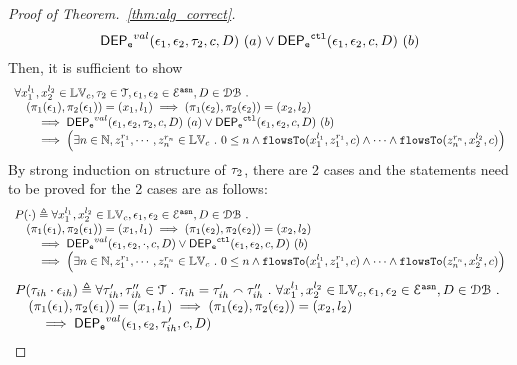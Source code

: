 \begin{proof}[Proof of Theorem.~\ref{thm:alg_correct}]
\[\mathsf{DEP_{\mathtt{e}}}^{val}(\mathtt{\epsilon}_1, \mathtt{\epsilon}_2, \mathtt{\tau}_2, c, D) ~ (a) 
\lor
\mathsf{DEP_{\mathtt{e}}}^{\mathtt{{ctl}}}(\mathtt{\epsilon}_1, \mathtt{\epsilon}_2, c, D) ~ (b)
\]
%
Then, it is sufficient to show
%
\[
\begin{array}{l}
\forall {x}_1^{l_1}, {x}_2^{l_2} \in \mathbb{LV}_{{c}}, \mathtt{\tau}_2 \in \mathcal{T}, 
\mathtt{\epsilon}_1, \mathtt{\epsilon}_2 \in \mathcal{E}^{\mathtt{{asn}}}, D \in \mathcal{DB} ~.~
\\ \quad
(\pi_{1}{(\mathtt{\epsilon}_1)}, \pi_{2}{(\mathtt{\epsilon}_1)}) = ({x}_1, l_1)
\implies
(\pi_{1}{(\mathtt{\epsilon}_2)}, \pi_{2}{(\mathtt{\epsilon}_2)}) = ({x}_2, l_2)
 \\ \qquad \implies 
\mathsf{DEP_{\mathtt{e}}}^{val}(\mathtt{\epsilon}_1, \mathtt{\epsilon}_2, \mathtt{\tau}_2, c, D) ~ (a)
\lor
\mathsf{DEP_{\mathtt{e}}}^{\mathtt{{ctl}}}(\mathtt{\epsilon}_1, \mathtt{\epsilon}_2, c, D)  ~ (b)
 \\ \qquad \implies
   \Big(\exists  n \in \mathbb{N}, z_1^{r_1}, \cdots, z_n^{r_n} \in \mathbb{LV}_{{c}} ~.~ 0 \leq n
 \land \mathtt{flowsTo}(x_1^{l_1}, z_1^{r_1}, c) \land \cdots \land \mathtt{flowsTo}(z_n^{r_n}, {x}_2^{l_2}, c) \Big)
\end{array}
\]
%
%
By strong induction on structure of $\vtrace_2$, there are 2 cases and the statements need to be proved for the 2 cases are as follows:
%
$$
\begin{array}{l}
P(\cdot)
 \triangleq
\forall {x}_1^{l_1}, {x}_2^{l_2} \in \lvar_{{c}},
\event_1, \event_2 \in \eventset^{\asn}, D \in \dbdom \st
\\ \quad
(\pi_{1}{(\event_1)}, \pi_{2}{(\event_1)}) = ({x}_1, l_1)
\implies
(\pi_{1}{(\event_2)}, \pi_{2}{(\event_2)}) = ({x}_2, l_2)
 \\ \qquad \implies 
\eventdep^{val}(\event_1, \event_2, \cdot, c, D)
\lor
\eventdep^{\ctl}(\event_1, \event_2, c, D)  ~ (b)
  \\ \qquad \implies
   \Big(\exists  n \in \mathbb{N}, z_1^{r_1}, \cdots, z_n^{r_n} \in \lvar_{{c}} \st 0 \leq n
 \land \flowsto(x_1^{l_1}, z_1^{r_1}, c) \land \cdots \land \flowsto(z_n^{r_n}, {x}_2^{l_2}, c) \Big)
\end{array}
$$
%
$$
\begin{array}{l}
P(\trace_{ih} \cdot \event_{ih})
\triangleq 
\forall \trace_{ih}', \trace_{ih}'' \in \mathcal{T} \st \trace_{ih} = \trace_{ih}' \tracecat \trace_{ih}'' \st
\forall {x}_1^{l_1}, {x}_2^{l_2} \in \lvar_{{c}},
\event_1, \event_2 \in \eventset^{\asn}, D \in \dbdom \st
\\ \quad
(\pi_{1}{(\event_1)}, \pi_{2}{(\event_1)}) = ({x}_1, l_1)
\implies
(\pi_{1}{(\event_2)}, \pi_{2}{(\event_2)}) = ({x}_2, l_2)
 \\ \qquad \implies 
\eventdep^{val}(\event_1, \event_2, \trace_{ih}', c, D)

\end{array}$$
\end{proof}

